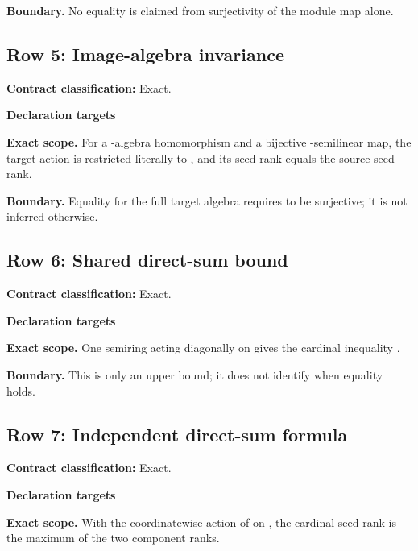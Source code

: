 \par\smallskip\noindent\textbf{Boundary.} No equality is claimed from surjectivity of the module map alone.
\medskip
{}\subsection{Row 5: Image-algebra invariance}
\label{row:5}
\textbf{Contract classification:} Exact.
\par\smallskip\textbf{Declaration targets}\par
{\small\noindent{}\par}
\medskip\noindent\textbf{Exact scope.} For a -algebra homomorphism  and a bijective -semilinear map, the target action is restricted literally to , and its seed rank equals the source seed rank.
\par\smallskip\noindent\textbf{Boundary.} Equality for the full target algebra  requires  to be surjective; it is not inferred otherwise.
\medskip
{}\subsection{Row 6: Shared direct-sum bound}
\label{row:6}
\textbf{Contract classification:} Exact.
\par\smallskip\textbf{Declaration targets}\par
{\small\noindent{}\par}
\medskip\noindent\textbf{Exact scope.} One semiring acting diagonally on  gives the cardinal inequality .
\par\smallskip\noindent\textbf{Boundary.} This is only an upper bound; it does not identify when equality holds.
\medskip
{}\subsection{Row 7: Independent direct-sum formula}
\label{row:7}
\textbf{Contract classification:} Exact.
\par\smallskip\textbf{Declaration targets}\par
{\small\noindent{}\par}
\medskip\noindent\textbf{Exact scope.} With the coordinatewise action of  on , the cardinal seed rank is the maximum of the two component ranks.
